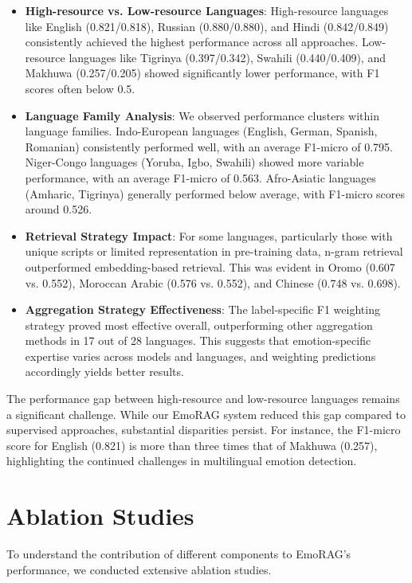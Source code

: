 \documentclass[a4paper,12pt]{extarticle}
\begin{document}
\begin{itemize}
\item \textbf{High-resource vs. Low-resource Languages}: High-resource languages like English (0.821/0.818), Russian (0.880/0.880), and Hindi (0.842/0.849) consistently achieved the highest performance across all approaches. Low-resource languages like Tigrinya (0.397/0.342), Swahili (0.440/0.409), and Makhuwa (0.257/0.205) showed significantly lower performance, with F1 scores often below 0.5.

\item \textbf{Language Family Analysis}: We observed performance clusters within language families. Indo-European languages (English, German, Spanish, Romanian) consistently performed well, with an average F1-micro of 0.795. Niger-Congo languages (Yoruba, Igbo, Swahili) showed more variable performance, with an average F1-micro of 0.563. Afro-Asiatic languages (Amharic, Tigrinya) generally performed below average, with F1-micro scores around 0.526.

\item \textbf{Retrieval Strategy Impact}: For some languages, particularly those with unique scripts or limited representation in pre-training data, n-gram retrieval outperformed embedding-based retrieval. This was evident in Oromo (0.607 vs. 0.552), Moroccan Arabic (0.576 vs. 0.552), and Chinese (0.748 vs. 0.698).

\item \textbf{Aggregation Strategy Effectiveness}: The label-specific F1 weighting strategy proved most effective overall, outperforming other aggregation methods in 17 out of 28 languages. This suggests that emotion-specific expertise varies across models and languages, and weighting predictions accordingly yields better results.
\end{itemize}

The performance gap between high-resource and low-resource languages remains a significant challenge. While our EmoRAG system reduced this gap compared to supervised approaches, substantial disparities persist. For instance, the F1-micro score for English (0.821) is more than three times that of Makhuwa (0.257), highlighting the continued challenges in multilingual emotion detection.


\section{Ablation Studies}

To understand the contribution of different components to EmoRAG's performance, we conducted extensive ablation studies.
\end{document}
